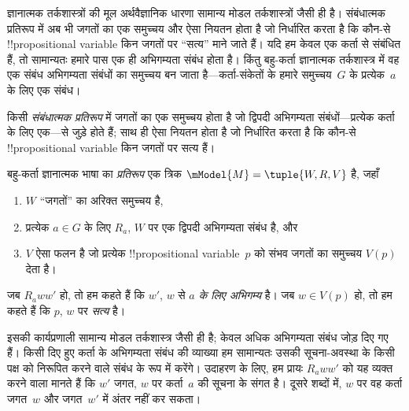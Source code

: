 \documentclass[../../../include/open-logic-section]{subfiles}
\begin{document}


ज्ञानात्मक तर्कशास्त्रों की मूल अर्थवैज्ञानिक धारणा सामान्य मोडल
तर्कशास्त्रों जैसी ही है। संबंधात्मक प्रतिरूप में अब भी जगतों का एक समुच्चय
और ऐसा नियतन होता है जो निर्धारित करता है कि कौन-से !!{propositional variable}
किन जगतों पर ``सत्य'' माने जाते हैं। यदि हम केवल एक कर्ता से संबंधित हैं,
तो सामान्यतः हमारे पास एक ही अभिगम्यता संबंध होता है। किंतु बहु-कर्ता
ज्ञानात्मक तर्कशास्त्र में वह एक संबंध अभिगम्यता संबंधों का समुच्चय बन जाता
है---कर्ता-संकेतों के हमारे समुच्चय~$G$ के प्रत्येक~$a$ के लिए एक संबंध।

किसी \emph{संबंधात्मक प्रतिरूप} में जगतों का एक समुच्चय होता है जो द्विपदी
अभिगम्यता संबंधों---प्रत्येक कर्ता के लिए एक---से जुड़े होते हैं; साथ ही ऐसा
नियतन होता है जो निर्धारित करता है कि कौन-से !!{propositional variable} किन
जगतों पर सत्य हैं।

\begin{defn}
  बहु-कर्ता ज्ञानात्मक भाषा का \emph{प्रतिरूप} एक त्रिक
  $\mModel{M} = \tuple{W, R, V}$ है, जहाँ
  \begin{enumerate}
  \item $W$ ``जगतों'' का अरिक्त समुच्चय है,
  \item प्रत्येक $a \in G$ के लिए ${R}_a$, $W$ पर एक द्विपदी अभिगम्यता
    संबंध है, और
  \item $V$ ऐसा फलन है जो प्रत्येक !!{propositional variable}~$p$ को संभव जगतों
    का समुच्चय $V(p)$ देता है।
  \end{enumerate}
  जब $R_a ww'$ हो, तो हम कहते हैं कि $w'$, $w$ से \emph{$a$ के लिए
    अभिगम्य} है। जब $w \in V(p)$ हो, तो हम कहते हैं कि $p$, $w$ पर
    \emph{सत्य} है।
\end{defn}

इसकी कार्यप्रणाली सामान्य मोडल तर्कशास्त्र जैसी ही है; केवल अधिक अभिगम्यता
संबंध जोड़ दिए गए हैं। किसी दिए हुए कर्ता के अभिगम्यता संबंध की व्याख्या
हम सामान्यतः उसकी सूचना-अवस्था के किसी पक्ष को निरूपित करने वाले संबंध के
रूप में करेंगे। उदाहरण के लिए, हम प्रायः $R_a ww'$ को यह व्यक्त करने वाला
मानते हैं कि $w'$ जगत, $w$ पर कर्ता~$a$ की सूचना के संगत है। दूसरे शब्दों
में, $w$ पर वह कर्ता जगत~$w$ और जगत~$w'$ में अंतर नहीं कर सकता।
\end{document}
